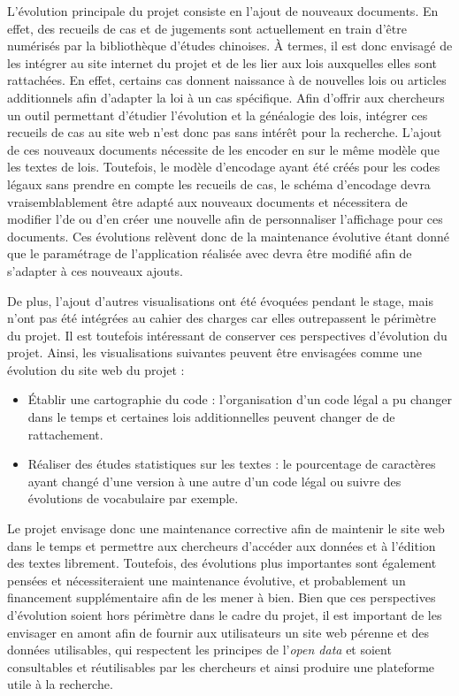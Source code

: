 L'évolution principale du projet \COREL consiste en l'ajout de nouveaux documents. En effet, des recueils de cas et de jugements sont actuellement en train d'être numérisés par la bibliothèque d'études chinoises. À termes, il est donc envisagé de les intégrer au site internet du projet et de les lier aux lois auxquelles elles sont rattachées. En effet, certains cas donnent naissance à de nouvelles lois ou articles additionnels afin d'adapter la loi à un cas spécifique. Afin d'offrir aux chercheurs un outil permettant d'étudier l'évolution et la généalogie des lois, intégrer ces recueils de cas au site web n'est donc pas sans intérêt pour la recherche. L'ajout de ces nouveaux documents nécessite de les encoder en \TEI sur le même modèle que les textes de lois. Toutefois, le modèle d'encodage ayant été créés pour les codes légaux sans prendre en compte les recueils de cas, le schéma d'encodage devra vraisemblablement être adapté aux nouveaux documents et nécessitera de modifier l'\ODD de \tp ou d'en créer une nouvelle afin de personnaliser l'affichage pour ces documents. Ces évolutions relèvent donc de la maintenance évolutive étant donné que le paramétrage de l'application réalisée avec \tp devra être modifié afin de s'adapter à ces nouveaux ajouts. 

De plus, l'ajout d'autres visualisations ont été évoquées pendant le stage, mais n'ont pas été intégrées au cahier des charges car elles outrepassent le périmètre du projet. Il est toutefois intéressant de conserver ces perspectives d'évolution du projet. Ainsi, les visualisations suivantes peuvent être envisagées comme une évolution du site web du projet : 

\begin{itemize}
    \item Établir une cartographie du code : l'organisation d'un code légal a pu changer dans le temps et certaines lois additionnelles peuvent changer de \lu de rattachement. 
    \item Réaliser des études statistiques sur les textes : le pourcentage de caractères ayant changé d'une version à une autre d'un code légal ou suivre des évolutions de vocabulaire par exemple.
\end{itemize}

Le projet \COREL envisage donc une maintenance corrective afin de maintenir le site web dans le temps et permettre aux chercheurs d'accéder aux données et à l'édition des textes librement. Toutefois, des évolutions plus importantes sont également pensées et nécessiteraient une maintenance évolutive, et probablement un financement supplémentaire afin de les mener à bien. Bien que ces perspectives d'évolution soient hors périmètre dans le cadre du projet, il est important de les envisager en amont afin de fournir aux utilisateurs un site web pérenne et des données utilisables, qui respectent les principes de l'\textit{open data} et soient consultables et réutilisables par les chercheurs et ainsi produire une plateforme utile à la recherche. 

